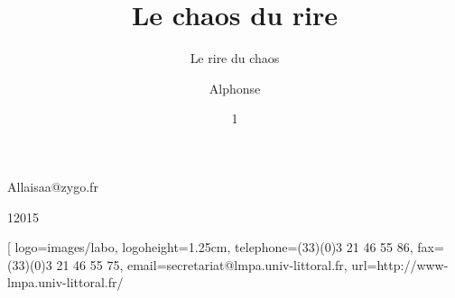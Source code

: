%
%
\author{Alphonse}{Allais}{aa@zygo.fr}
%
\title[Laugh's Chaos]{Le chaos du rire}
%
\subtitle[Chaos' laugh]{Le rire du chaos}
%
%
%
\date{1}{1}{2015}
%
\subject[Chaotic Laugh]{Rire chaotique}
%
%
%
%
%
%
\laboratory[
logo=images/labo,
logoheight=1.25cm,
telephone=(33)(0)3 21 46 55 86,
fax=(33)(0)3 21 46 55 75,
email=secretariat@lmpa.univ-littoral.fr,
url=http://www-lmpa.univ-littoral.fr/
